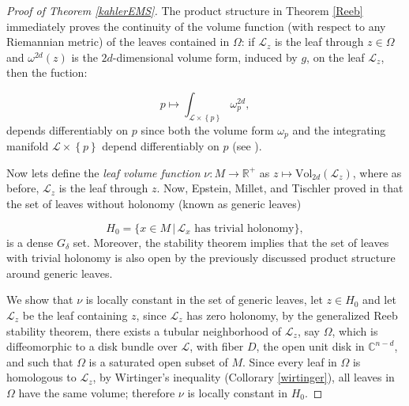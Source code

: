 \documentclass[12pt,twoside,a4paper]{report}
\newcommand{\re}{\ensuremath{\mathbb R }}
\newcommand{\co}{\ensuremath{\mathbb C }}
\begin{document}
  \begin{proof}[Proof of Theorem \ref{kahlerEMS}]
  The product structure in Theorem \ref{Reeb} immediately proves the continuity of the volume function (with respect to any Riemannian metric) of the leaves contained in $\Omega$: if $\mathcal{L}_z$ is the leaf through $z\in\Omega$ and $\omega^{2d}(z)$ is the $2d$-dimensional volume form, induced by $g$, on the leaf $\mathcal{L}_z$, then the fuction:

  \begin{equation}\label{oneline}
  p\mapsto  \int_{\mathcal{L}\times{\left\{p\right\}}}\omega^{2d}_{p},
  \end{equation}
  depends differentiably on $p$ since both the volume form $\omega_p$ and the integrating manifold ${\mathcal{L}\times{\left\{p\right\}}}$ depend differentiably on $p$ (see \cite{Simon}).

  Now lets define the \emph{leaf volume function} $\nu:M\rightarrow\re^{+}$ as $z\mapsto \textrm{Vol}_{2d}(\mathcal{L}_z)$, where as before, $\mathcal{L}_z$ is the leaf through $z$. Now, Epstein, Millet, and Tischler proved in \cite{EMT} that the set of leaves without holonomy (known as generic leaves)

  \begin{equation}\label{generic-leaves}
    H_0=\lbrace x\in M\,|\,\mathcal{L}_x\text{ has trivial holonomy}\rbrace,
  \end{equation}
  \noindent is a dense $G_\delta$ set. Moreover, the stability theorem implies that the set of leaves with trivial holonomy is also open by the previously discussed product structure around generic leaves.

  We show that $\nu$ is locally constant in the set of generic leaves, let $z\in H_0$ and let $\mathcal{L}_z$ be the leaf containing $z$, since $\mathcal{L}_z$ has zero holonomy, by the generalized Reeb stability theorem, there exists a tubular neighborhood of $\mathcal{L}_z$, say $\Omega$, which is diffeomorphic to a disk bundle over $\mathcal{L}$, with fiber $D$, the open unit disk in $\co^{n-d}$, and such that $\Omega$ is a saturated open subset of $M$. Since every leaf in $\Omega$ is homologous to $\mathcal{L}_z$, by Wirtinger's inequality (Collorary \ref{wirtinger}), all leaves in $\Omega$ have the same volume; therefore $\nu$ is locally constant in $H_0$.


\end{proof}
\end{document}
